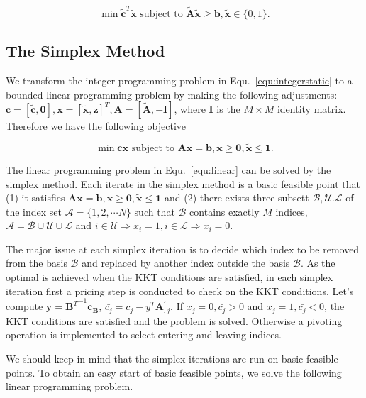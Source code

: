 \documentclass{llncs}
\begin{document}
\begin{equation}\label{equ:integerstatic}
\min \tilde{\mathbf{c}}^T\tilde{\mathbf{x}}\textrm{ subject to } \tilde{\mathbf{A}}\tilde{\mathbf{x}}\geq \mathbf{b}, \tilde{\mathbf{x}}\in \{0,1\}.
\end{equation}

\subsection{The Simplex Method}
We transform the integer programming problem in Equ.~\ref{equ:integerstatic} to a bounded linear programming problem by making the following adjustments: $\mathbf{c}=[\tilde{\mathbf{c}},\mathbf{0}],\mathbf{x}=[\tilde{\mathbf{x}},\mathbf{z}]^T,\mathbf{A}=[\tilde{\mathbf{A}},-\mathbf{I}]$, where $\mathbf{I}$ is the $M\times M$ identity matrix. Therefore we have the following objective

\begin{equation}\label{equ:linear}
\min \mathbf{cx} \textrm{ subject to } \mathbf{Ax} = \mathbf{b}, \mathbf{x}\geq \mathbf{0},\tilde{\mathbf{x}} \leq \mathbf{1}.
\end{equation}

The linear programming problem in Equ.~\ref{equ:linear} can be solved by the simplex method. Each iterate in the simplex method is a basic feasible point that (1) it satisfies $\mathbf{Ax} = \mathbf{b}, \mathbf{x}\geq \mathbf{0},\tilde{\mathbf{x}} \leq \mathbf{1}$ and (2) there exists three subsett $\mathcal{B,U.L}$ of the index set $\mathcal{A}=\{1,2,\cdots N\}$ such that $\mathcal{B}$ contains exactly $M$ indices, $\mathcal{A}=\mathcal{B}\cup \mathcal{U} \cup \mathcal{L}$ and $i \in \mathcal{U} \Rightarrow x_i=1,i \in \mathcal{L} \Rightarrow x_i=0$.

The major issue at each simplex iteration is to decide which index to be removed from the basis $\mathcal{B}$ and replaced by another index outside the basis $\mathcal{B}$.  As the optimal is achieved when the KKT conditions are satisfied, in each simplex iteration first  a pricing step is conducted to check on the KKT conditions.  Let's compute $\mathbf{y} = {\mathbf{B}^T}^{-1}\mathbf{c_B}$, $\bar{c_j} = c_j - y^T\mathbf{A}_{,j}^{'}$. If $x_j = 0, \bar{c_j} > 0$ and $x_j = 1,\bar{c_j} < 0$,  the KKT conditions are satisfied and the problem is solved. Otherwise a pivoting operation is implemented to select entering and leaving indices.

We should keep in mind that the simplex iterations are run on basic feasible points. To obtain an easy start of basic feasible points, we solve the following linear programming problem.
\end{document}
